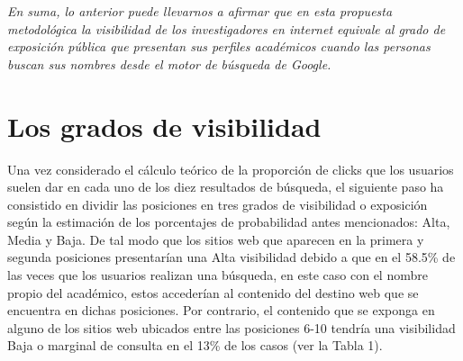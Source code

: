 \documentclass[
]{interact}
\begin{document}
\emph{En suma, lo anterior puede llevarnos a afirmar que en esta
propuesta metodológica la visibilidad de los investigadores en internet
equivale al grado de exposición pública que presentan sus perfiles
académicos cuando las personas buscan sus nombres desde el motor de
búsqueda de Google.}

\section{Los grados de visibilidad}\label{los-grados-de-visibilidad}

Una vez considerado el cálculo teórico de la proporción de clicks que
los usuarios suelen dar en cada uno de los diez resultados de búsqueda,
el siguiente paso ha consistido en dividir las posiciones en tres grados
de visibilidad o exposición según la estimación de los porcentajes de
probabilidad antes mencionados: Alta, Media y Baja. De tal modo que los
sitios web que aparecen en la primera y segunda posiciones presentarían
una Alta visibilidad debido a que en el 58.5\% de las veces que los
usuarios realizan una búsqueda, en este caso con el nombre propio del
académico, estos accederían al contenido del destino web que se
encuentra en dichas posiciones. Por contrario, el contenido que se
exponga en alguno de los sitios web ubicados entre las posiciones 6-10
tendría una visibilidad Baja o marginal de consulta en el 13\% de los
casos (ver la Tabla 1).
\end{document}
